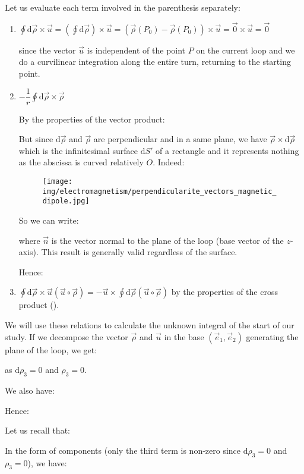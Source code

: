	Let us evaluate each term involved in the parenthesis separately:
	\begin{enumerate}
		\item $\oint\mathrm{d}\vec{\rho}\times\vec{u}=\left(\oint\mathrm{d}\vec{\rho}\right)\times\vec{u}=\left(\vec{\rho}(P_0)-\vec{\rho}(P_0)\right)\times\vec{u}=\vec{0}\times\vec{u}=\vec{0}$

	since the vector $\vec{u}$ is independent of the point $P$ on the current loop and we do a curvilinear integration along the entire turn, returning to the starting point.

		\item $-\dfrac{1}{r}\oint \mathrm{d}\vec{\rho}\times\vec{\rho}$

		By the properties of the vector product:
		
		But since $\mathrm{d}\vec{\rho}$ and $\vec{\rho}$ are perpendicular and in a same plane, we have $\vec{\rho}\times\mathrm{d}\vec{\rho}$ which is the infinitesimal surface $\mathrm{d}S'$ of a rectangle and it represents nothing as the 
abscissa is curved relatively $O$. Indeed:
		\begin{figure}[H]
			\centering
			\texttt{[image: img/electromagnetism/perpendicularite\_vectors\_magnetic\_dipole.jpg]}
		\end{figure}
		So we can write:
		
		where $\vec{n}$ is the vector normal to the plane of the loop (base vector of the $z$-axis). This result is generally valid regardless of the surface.

		Hence:
		
		
		\item $\oint\mathrm{d}\vec{\rho}\times\vec{u}(\vec{u}\circ\vec{\rho})=-\vec{u}\times\oint\mathrm{d}\vec{\rho}(\vec{u}\circ\vec{\rho})$ by the properties of the cross product ().
	\end{enumerate}
	We will use these relations to calculate the unknown integral of the start of our study. If we decompose the vector $\vec{\rho}$ and $\vec{u}$ in the base $(\vec{e}_1,\vec{e}_2)$ generating the plane of the loop, we get:
	
	as $\mathrm{d}\rho_3=0$ and $\rho_3=0$.

	We also have:
	
	Hence:
	
	Let us recall that:
	
	In the form of components (only the third term is non-zero since $\mathrm{d}\rho_3=0$ and $\rho_3=0$), we have:
	
